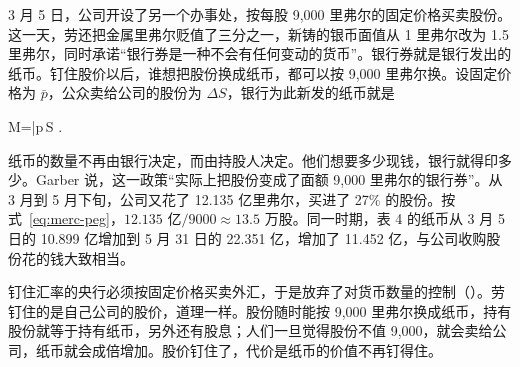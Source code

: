 3 月 5 日，公司开设了另一个办事处，按每股 9,000 里弗尔的固定价格买卖股份\cite{velde2003}。这一天，劳还把金属里弗尔贬值了三分之一，新铸的银币面值从 1 里弗尔改为 1.5 里弗尔，同时承诺“银行券是一种不会有任何变动的货币”\cite{velde2003}。银行券就是银行发出的纸币。钉住股价以后，谁想把股份换成纸币，都可以按 9,000 里弗尔换。设固定价格为 $\bar p$，公众卖给公司的股份为 $\Delta S$，银行为此新发的纸币就是
\begin{keyeq}
\Delta M=\bar p\,\Delta S .\label{eq:merc-peg}
\end{keyeq}
纸币的数量不再由银行决定，而由持股人决定。他们想要多少现钱，银行就得印多少。Garber 说，这一政策“实际上把股份变成了面额 9,000 里弗尔的银行券”\cite{garber1990}。从 3 月到 5 月下旬，公司又花了 12.135 亿里弗尔，买进了 27\% 的股份\cite{velde2003}。按式~\eqref{eq:merc-peg}，$12.135\text{ 亿}/9000\approx13.5$ 万股。同一时期，表 4 的纸币从 3 月 5 日的 10.899 亿增加到 5 月 31 日的 22.351 亿，增加了 11.452 亿，与公司收购股份花的钱大致相当\cite{velde2003}。

\begin{intuition}[钉住股价就是放弃控制货币]
钉住汇率的央行必须按固定价格买卖外汇，于是放弃了对货币数量的控制（）。劳钉住的是自己公司的股价，道理一样。股份随时能按 9,000 里弗尔换成纸币，持有股份就等于持有纸币，另外还有股息；人们一旦觉得股份不值 9,000，就会卖给公司，纸币就会成倍增加。股价钉住了，代价是纸币的价值不再钉得住。
\end{intuition}


